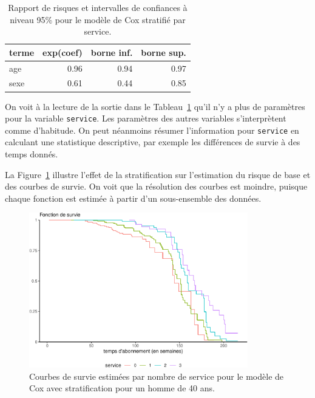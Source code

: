 \documentclass[
  11pt,
  letterpaper,
]{book}
\theoremstyle{definition}
\theoremstyle{remark}
\begin{document}
\hypertarget{tbl-cox-stratif}{}
\begin{table}
\caption{\label{tbl-cox-stratif}Rapport de risques et intervalles de confiances à niveau 95\% pour le
modèle de Cox stratifié par service. }\tabularnewline

\centering
\begin{tabular}{lrrr}
\toprule
terme & exp(coef) & borne inf. & borne sup.\\
\midrule
age & 0.96 & 0.94 & 0.97\\
sexe & 0.61 & 0.44 & 0.85\\
\bottomrule
\end{tabular}
\end{table}

On voit à la lecture de la sortie dans le Tableau~\ref{tbl-cox-stratif}
qu'il n'y a plus de paramètres pour la variable \texttt{service}. Les
paramètres des autres variables s'interprètent comme d'habitude. On peut
néanmoins résumer l'information pour \texttt{service} en calculant une
statistique descriptive, par exemple les différences de survie à des
temps donnés.

La Figure~\ref{fig-courbesurviesstrat} illustre l'effet de la
stratification sur l'estimation du risque de base et des courbes de
survie. On voit que la résolution des courbes est moindre, puisque
chaque fonction est estimée à partir d'un sous-ensemble des données.

\begin{figure}[ht!]

{\centering \includegraphics[width=0.85\textwidth,height=\textheight]{./06-survie_files/figure-pdf/fig-courbesurviesstrat-1.pdf}

}

\caption{\label{fig-courbesurviesstrat}Courbes de survie estimées par
nombre de service pour le modèle de Cox avec stratification pour un
homme de 40 ans.}

\end{figure}
\end{document}
